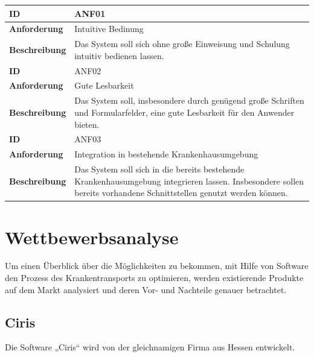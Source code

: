 \documentclass[a4paper, ngerman, 12pt]{scrartcl}
\begin{document}
\begin{tabular}{|l|p{10cm}|}
\hline
\cellcolor{lightgray}\textbf{ID}&ANF01\\
\hline
\cellcolor{lightgray}\textbf{Anforderung}&Intuitive Bedinung\\
\hline
\cellcolor{lightgray}\textbf{Beschreibung}&Das System soll sich ohne große Einweisung und Schulung intuitiv bedienen lassen.\\
\hline
\hline
\cellcolor{lightgray}\textbf{ID}&ANF02\\
\hline
\cellcolor{lightgray}\textbf{Anforderung}&Gute Lesbarkeit\\
\hline
\cellcolor{lightgray}\textbf{Beschreibung}&Das System soll, insbesondere durch genügend große Schriften und Formularfelder, eine gute Lesbarkeit für den Anwender bieten.\\
\hline
\hline
\cellcolor{lightgray}\textbf{ID}&ANF03\\
\hline
\cellcolor{lightgray}\textbf{Anforderung}&Integration in bestehende Krankenhausumgebung\\
\hline
\cellcolor{lightgray}\textbf{Beschreibung}&Das System soll sich in die bereits bestehende Krankenhausumgebung integrieren lassen. Insbesondere sollen bereits vorhandene Schnittstellen genutzt werden können.\\
\hline
\end{tabular}
\section{Wettbewerbsanalyse}
Um einen Überblick über die Möglichkeiten zu bekommen, mit Hilfe von Software den Prozess des Krankentransports zu optimieren, werden existierende Produkte auf dem Markt analysiert und deren Vor- und Nachteile genauer betrachtet.
\subsection{Ciris}
Die Software „Ciris“ wird von der gleichnamigen Firma aus Hessen entwickelt.\\
\end{document}
